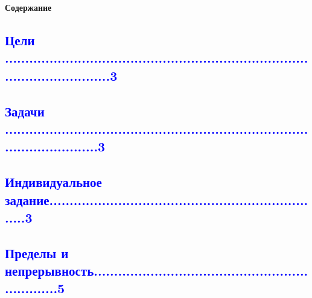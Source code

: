 \documentclass{article}
\begin{document}
\newpage
\begin{flushleft}

  \textbf{\LARGE Содержание}
\subsection{\textcolor{blue}{Цели .....................................................................................................3}}
\subsection{\textcolor{blue}{Задачи ..................................................................................................3}}
\subsection{\textcolor{blue}{Индивидуальное задание.....................................................................3\\}}
\indent{\section{\textcolor{blue}{Индивидуальное задание                          }}}
\subsection{\textcolor{blue}{Пределы и непрерывность..................................................................5\\}}
\end{flushleft}
\newpage
\setcounter{section}{0}
\setcounter{subsection}{0}
\end{document}
